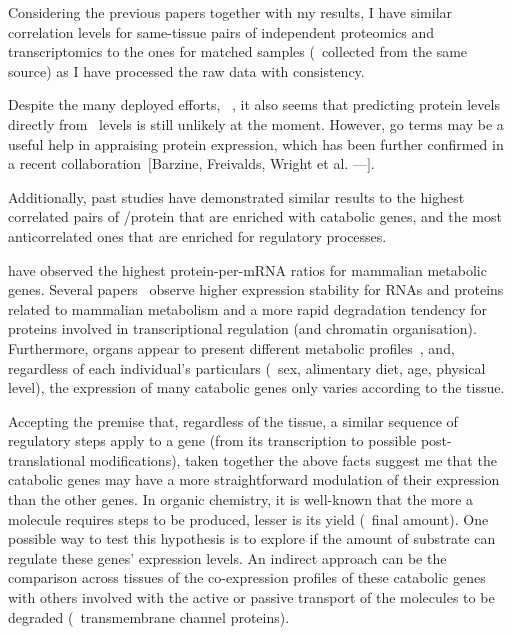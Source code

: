 Considering the previous papers together with my results,
I have similar correlation levels for same-tissue pairs of
independent proteomics and transcriptomics
to the ones for matched samples (\ie\ collected from the same source)
as I have processed the raw data with consistency.\mybr\

Despite the many deployed efforts,
\eg\ \citet{Franks2017-bp,Eraslan2019-md},
it also seems that predicting protein levels directly from \mRNA\ levels
is still unlikely at the moment.
However, \gls{go} terms may be a useful help in appraising protein expression,
which has been further confirmed in a recent collaboration~$\lbrack$Barzine,
Freivalds, Wright et al. ---\cite{deepLearning2020}$\rbrack$.\mybr\

Additionally, past studies have demonstrated similar results to
the highest correlated pairs of \mRNA/protein
that are enriched with catabolic genes,
and the most anticorrelated ones that are enriched for regulatory processes.\mybr\

\citet{Vogel2010-ux} have observed the highest protein-per-mRNA ratios
for mammalian metabolic genes.
Several papers~
observe higher expression stability for
\glspl{RNA} and proteins related to mammalian metabolism
and a more rapid degradation tendency
for proteins involved in transcriptional regulation (and chromatin organisation).
Furthermore, organs appear to present
different metabolic profiles~,
and, regardless of each individual's particulars
(\eg\ sex, alimentary diet, age, physical level),
the expression of many catabolic genes only varies according to the tissue.\mybr\

Accepting the premise that,
regardless of the tissue,
a similar sequence of regulatory steps apply to a gene
(from its transcription to possible post-translational modifications),
taken together the above facts suggest me that
the catabolic genes may have
a more straightforward modulation of their expression than the other genes.
In organic chemistry,
it is well-known that the more a molecule requires steps to be produced,
lesser is its yield (\ie\ final amount).
One possible way to test this hypothesis is to explore if
the amount of substrate can regulate these genes' expression levels.
An indirect approach can be
the comparison across tissues of the co-expression profiles of these catabolic genes
with others involved with the active or passive transport of the molecules
to be degraded (\eg\ transmembrane channel proteins).\mybr\

